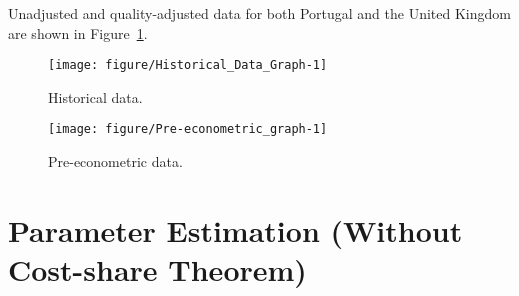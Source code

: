 \documentclass[preprint,authoryear,12pt]{elsarticle}\usepackage[]{graphicx}\usepackage[]{color}
\makeatletter
\def\maxwidth{ %
  \ifdim\Gin@nat@width>\linewidth
    \linewidth
  \else
    \Gin@nat@width
  \fi
}
\newenvironment{knitrout}{}{} %
\makeatother
\begin{document}
Unadjusted and quality-adjusted data for both Portugal and the United Kingdom 
are shown in Figure~\ref{fig:Historical Data Graph}.

\begin{knitrout}
\color{fgcolor}\begin{figure}[H]

{\centering \texttt{[image: figure/Historical\_Data\_Graph-1]} 

}

\caption[Historical data]{Historical data.}\label{fig:Historical Data Graph}
\end{figure}


\end{knitrout}

\begin{knitrout}
\color{fgcolor}\begin{figure}[H]

{\centering \texttt{[image: figure/Pre-econometric\_graph-1]} 

}

\caption[Pre-econometric data]{Pre-econometric data.}\label{fig:Pre-econometric graph}
\end{figure}


\end{knitrout}


\section{Parameter Estimation (Without Cost-share Theorem)}
\label{sec:parameter_estimation_noCST}

% 
\end{document}

